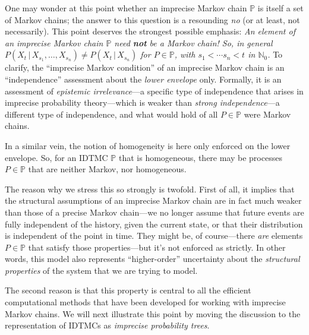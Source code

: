 \documentclass[graybox]{svmult}
\newcommand{\nats}{\mathbb{N}}
\newcommand{\natswith}{\nats_{0}}
\begin{document}
One may wonder at this point whether an imprecise Markov chain $\mathbb{P}$ is itself a set of Markov chains; the answer to this question is a resounding \emph{no} (or at least, not necessarily). This point deserves the strongest possible emphasis:
\quad\newline\newline
\noindent \emph{An element of an imprecise Markov chain $\mathbb{P}$ need {\bf not} be a Markov chain! So, in general $P(X_t\,\vert\,X_{s_1},\ldots,X_{s_n})\neq P(X_t\,\vert\,X_{s_n})$ for $P\in\mathbb{P}$, with $s_1<\cdots s_n<t$ in $\natswith$.}
\quad\newline\newline
To clarify, the ``imprecise Markov condition'' of an imprecise Markov chain is an ``independence'' assessment about the \emph{lower envelope} only. Formally, it is an assessment of \emph{epistemic irrelevance}---a specific type of independence that arises in imprecise probability theory---which is weaker than \emph{strong independence}---a different type of independence, and what would hold of all $P\in\mathbb{P}$ were Markov chains.

In a similar vein, the notion of homogeneity is here only enforced on the lower envelope. So, for an IDTMC $\mathbb{P}$ that is homogeneous, there may be processes $P\in\mathbb{P}$ that are neither Markov, nor homogeneous.

The reason why we stress this so strongly is twofold. First of all, it implies that the structural assumptions of an imprecise Markov chain are in fact much weaker than those of a precise Markov chain---we no longer assume that future events are fully independent of the history, given the current state, or that their distribution is independent of the point in time. They might be, of course---there \emph{are} elements $P\in\mathbb{P}$ that satisfy those properties---but it's not enforced as strictly. In other words, this model also represents ``higher-order'' uncertainty about the \emph{structural properties} of the system that we are trying to model.

The second reason is that this property is central to all the efficient computational methods that have been developed for working with imprecise Markov chains. We will next illustrate this point by moving the discussion to the representation of IDTMCs as \emph{imprecise probability trees}.

\end{document}
